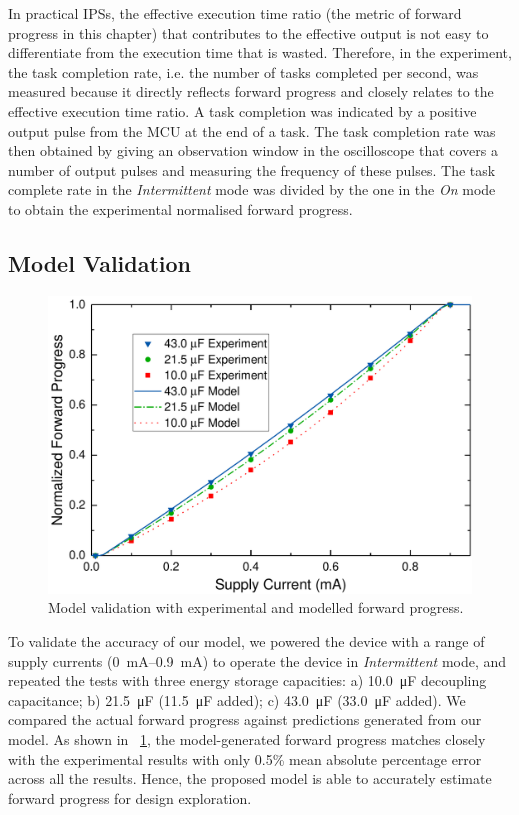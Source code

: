 In practical IPSs, the effective execution time ratio (the metric of forward progress in this chapter) that contributes to the effective output is not easy to differentiate from the execution time that is wasted.
Therefore, in the experiment, the task completion rate, i.e. the number of tasks completed per second, was measured because it directly reflects forward progress and closely relates to the effective execution time ratio.
A task completion was indicated by a positive output pulse from the MCU at the end of a task.
The task completion rate was then obtained by giving an observation window in the oscilloscope that covers a number of output pulses and measuring the frequency of these pulses. 
The task complete rate in the \textit{Intermittent} mode was divided by the one in the \textit{On} mode to obtain the experimental normalised forward progress.

\subsection{Model Validation} 

\begin{figure}
	\centering
	\includegraphics[width=\columnwidth]{ch3_sizingeffect/figures/ModelValidFig}
	\caption{Model validation with experimental and modelled forward progress. }
	\label{fig:modelvalid}
\end{figure}

To validate the accuracy of our model, we powered the device with a range of supply currents (\SIrange{0}{0.9}{\milli\ampere}) to operate the device in \textit{Intermittent} mode, and repeated the tests with three energy storage capacities: a) \SI{10.0}{\micro\farad} decoupling capacitance; b) \SI{21.5}{\micro\farad} (\SI{11.5}{\micro\farad} added); c) \SI{43.0}{\micro\farad} (\SI{33.0}{\micro\farad} added).
We compared the actual forward progress against predictions generated from our model. 
As shown in \figurename{~\ref{fig:modelvalid}}, the model-generated forward progress matches closely with the experimental results with only 0.5\% mean absolute percentage error across all the results. 
Hence, the proposed model is able to accurately estimate forward progress for design exploration. 

